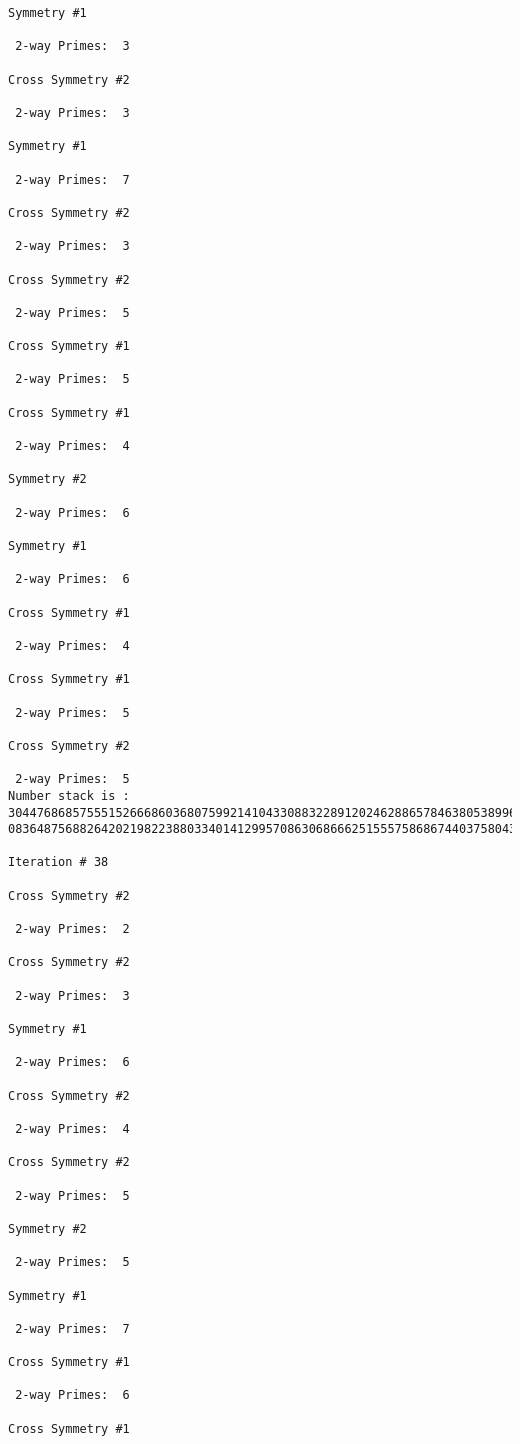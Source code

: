 {{{{\begin{verbatim}
Symmetry #1

 2-way Primes: 	3

Cross Symmetry #2

 2-way Primes: 	3

Symmetry #1

 2-way Primes: 	7

Cross Symmetry #2

 2-way Primes: 	3

Cross Symmetry #2

 2-way Primes: 	5

Cross Symmetry #1

 2-way Primes: 	5

Cross Symmetry #1

 2-way Primes: 	4

Symmetry #2

 2-way Primes: 	6

Symmetry #1

 2-way Primes: 	6

Cross Symmetry #1

 2-way Primes: 	4

Cross Symmetry #1

 2-way Primes: 	5

Cross Symmetry #2

 2-way Primes: 	5
Number stack is :
30447686857555152666860368075992141043308832289120246288657846380538996794608835958544046240163340857
08364875688264202198223880334014129957086306866625155575868674403758043361042640445859538806497699835

Iteration #	38

Cross Symmetry #2

 2-way Primes: 	2

Cross Symmetry #2

 2-way Primes: 	3

Symmetry #1

 2-way Primes: 	6

Cross Symmetry #2

 2-way Primes: 	4

Cross Symmetry #2

 2-way Primes: 	5

Symmetry #2

 2-way Primes: 	5

Symmetry #1

 2-way Primes: 	7

Cross Symmetry #1

 2-way Primes: 	6

Cross Symmetry #1


\end{verbatim}}}}}
